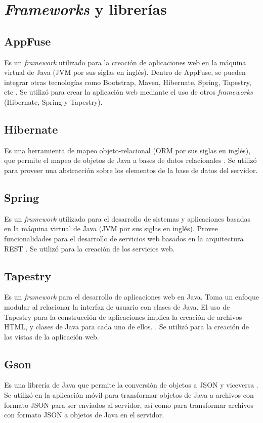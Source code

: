 \section{\textit{Frameworks} y librerías} \label{Frameworks y librerias}

\subsection{AppFuse}
Es un \textit{framework} utilizado para la creación de aplicaciones web en la máquina virtual de Java (JVM por sus siglas en inglés). Dentro de AppFuse, se pueden integrar otras tecnologías como Bootstrap, Maven, Hibernate, Spring, Tapestry, etc \cite{APF1}. Se utilizó para crear la aplicación web mediante el uso de otros \textit{frameworks} (Hibernate, Spring y Tapestry).

\subsection{Hibernate}
Es una herramienta de mapeo objeto-relacional (ORM por sus siglas en inglés), que permite el mapeo de objetos de Java a bases de datos relacionales \cite{HBR1}. Se utilizó para proveer una abstracción sobre los elementos de la base de datos del servidor.

\subsection{Spring}
Es un \textit{framework} utilizado para el desarrollo de sistemas y aplicaciones basadas en la máquina virtual de Java (JVM por sus siglas en inglés). Provee funcionalidades para el desarrollo de servicios web basados en la arquitectura REST \cite{SPRNG0}. Se utilizó para la creación de los servicios web.

\subsection{Tapestry}
Es un \textit{framework} para el desarrollo de aplicaciones web en Java. Toma un enfoque modular al relacionar la interfaz de usuario con clases de Java. El uso de Tapestry para la construcción de aplicaciones implica la creación de archivos HTML, y clases de Java para cada uno de ellos. \cite{ATP1}. Se utilizó para la creación de las vistas de la aplicación web.

\subsection{Gson}
Es una librería de Java que permite la conversión de objetos a JSON y viceversa \cite{GSN1}. Se utilizó en la aplicación móvil para transformar objetos de Java a archivos con formato JSON para ser enviados al servidor, así como para transformar archivos con formato JSON a objetos de Java en el servidor.

